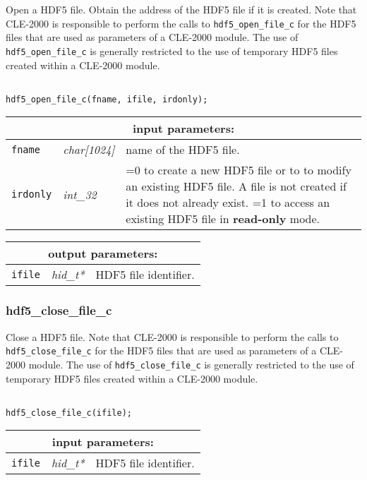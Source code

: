 Open a HDF5 file. Obtain the address of the HDF5 file if it is created. Note that CLE-2000 is responsible to perform the calls to
{\tt hdf5\_open\_file\_c} for the HDF5 files that are used as parameters of a CLE-2000 module. The use
of {\tt hdf5\_open\_file\_c} is generally restricted to the use of temporary HDF5 files created within a CLE-2000 module.

\begin{verbatim}

hdf5_open_file_c(fname, ifile, irdonly);
\end{verbatim}

\noindent
\begin{tabular}{|p{1.5cm}|p{2cm}|p{11cm}|}
\hline
\multicolumn{3}{|c|}{\bf input parameters:} \\
\hline
{\tt fname} & {\it char[1024]} & name of the HDF5 file. \\
\hline
{\tt irdonly} & {\it int\_32} & =0 to create a new HDF5 file or to to modify an existing HDF5 file. A file is not created if it does not already exist. 
				=1 to access an existing HDF5 file in {\bf read-only} mode. \\
\hline
\end{tabular}

\vskip 0.8cm

\noindent
\begin{tabular}{|p{1.5cm}|p{2cm}|p{11cm}|}
\hline
\multicolumn{3}{|c|}{\bf output parameters:} \\
\hline
{\tt ifile} & {\it hid\_t*} & HDF5 file identifier. \\
\hline
\end{tabular}

\subsubsection{hdf5\_close\_file\_c}

Close a HDF5 file. Note that CLE-2000 is responsible to perform the calls to
{\tt hdf5\_close\_file\_c} for the HDF5 files that are used as parameters of a CLE-2000 module. The use
of {\tt hdf5\_close\_file\_c} is generally restricted to the use of temporary HDF5 files created within a CLE-2000 module.

\begin{verbatim}

hdf5_close_file_c(ifile);
\end{verbatim}

\noindent
\begin{tabular}{|p{1.5cm}|p{2cm}|p{11cm}|}
\hline
\multicolumn{3}{|c|}{\bf input parameters:} \\
\hline
{\tt ifile} & {\it hid\_t*} & HDF5 file identifier. \\
\hline
\end{tabular}

